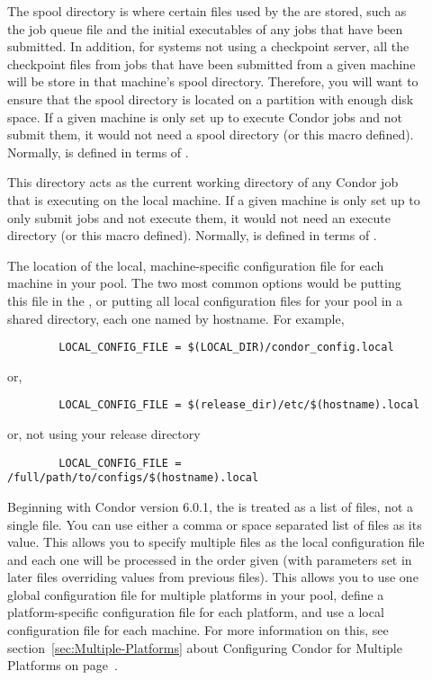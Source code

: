 \begin{description}
\item[] \label{param:Spool} The spool directory is where
  certain files used by the  are stored, such as the
  job queue file and the initial executables of any jobs that have
  been submitted.  In addition, for systems not using a checkpoint
  server, all the checkpoint files from jobs that have been submitted
  from a given machine will be store in that machine's spool
  directory.  Therefore, you will want to ensure that the spool
  directory is located on a partition with enough disk space.  If a
  given machine is only set up to execute Condor jobs and not submit
  them, it would not need a spool directory (or this macro defined).
  Normally,  is defined in terms of
  .
  
\item[] \label{param:Execute} This directory acts as
  the current working directory of any Condor job that is executing on
  the local machine.  If a given machine is only set up to only submit
  jobs and not execute them, it would not need an execute directory
  (or this macro defined).  Normally,  is defined
  in terms of .
  
\item[] \label{param:LocalConfigFile} The
  location of the local, machine-specific configuration
  file for each machine
  in your pool.  The two most common options would be putting this
  file in the , or putting all
  local configuration files for your pool in a shared directory, each one
  named by hostname.  For example,
\begin{verbatim}
        LOCAL_CONFIG_FILE = $(LOCAL_DIR)/condor_config.local
\end{verbatim}
  or,
\begin{verbatim}
        LOCAL_CONFIG_FILE = $(release_dir)/etc/$(hostname).local
\end{verbatim}
  or, not using your release directory
\begin{verbatim}
        LOCAL_CONFIG_FILE = /full/path/to/configs/$(hostname).local
\end{verbatim}
  
  Beginning with Condor version 6.0.1, the 
  is treated as a list of files, not a single file.  You can use
  either a comma or space separated list of files as its value.  This
  allows you to specify multiple files as the local configuration file
  and each one will be processed in the order given (with parameters set in
  later files overriding values from previous files).  This allows
  you to use one global configuration file for multiple platforms
  in your pool,
  define a platform-specific configuration file for each platform, and
  use a local configuration file for each machine.  For more
  information on this, see section~\ref{sec:Multiple-Platforms} about
  Configuring Condor for Multiple Platforms on
  page~\pageref{sec:Multiple-Platforms}.


\end{description}
